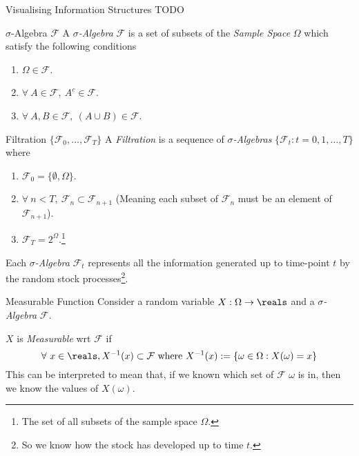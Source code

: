 \documentclass[11pt,a4paper]{article}
\begin{document}
  \begin{remark}{Visualising Information Structures}
    TODO
  \end{remark}

  \begin{definition}{$\sigma$-Algebra $\mathcal{F}$}
    A \textit{$\sigma$-Algebra} $\mathcal{F}$ is a set of subsets of the \textit{Sample Space} $\Omega$ which satisfy the following conditions
    \begin{enumerate}
      \item $\Omega\in\mathcal{F}$.
      \item $\forall\ A\in\mathcal{F},\ A^c\in\mathcal{F}$.
      \item $\forall\ A,B\in\mathcal{F},\ (A\cup B)\in\mathcal{F}$.
    \end{enumerate}
  \end{definition}

  \begin{definition}{Filtration $\{\mathcal{F}_0,\dots,\mathcal{F}_T\}$}
    A \textit{Filtration} is a sequence of \textit{$\sigma$-Algebras} $\{\mathcal{F}_t:t=0,1,\dots,T\}$ where
    \begin{enumerate}
      \item $\mathcal{F}_0=\{\emptyset,\Omega\}$.
      \item $\forall\ n<T,\ \mathcal{F}_n\subset\mathcal{F}_{n+1}$ (Meaning each subset of $\mathcal{F}_n$ must be an element of $\mathcal{F}_{n+1}$).
      \item $\mathcal{F}_T=2^\Omega$.\footnote{The set of all subsets of the sample space $\Omega$.}
    \end{enumerate}
    Each \textit{$\sigma$-Algebra} $\mathcal{F}_t$ represents all the information generated up to time-point $t$ by the random stock processes\footnote{So we know how the stock has developed up to time $t$.}.
  \end{definition}

  \begin{definition}{Measurable Function}
    Consider a random variable $X:\Omega\to\reals$ and a \textit{$\sigma$-Algebra} $\mathcal{F}$.
    \par $X$ is \textit{Measurable} wrt $\mathcal{F}$ if
    \[ \forall\ x\in\reals, X^{-1}(x)\subset\mathcal{F}\text{ where }X^{-1}(x):=\{\omega\in\Omega:X(\omega)=x\} \]
    This can be interpreted to mean that, if we known which set of $\mathcal{F}$ $\omega$ is in, then we know the values of $X(\omega)$.
  \end{definition}
\end{document}
